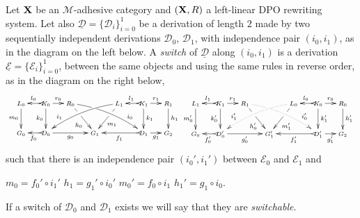 \documentclass[a4paper,UKenglish,cleveref,pdftex,thm-restate,numberwithinsect,anonymous]{lipics}
\def\R{\mathsf{R}}
\def\X{\textbf {\textup{X}}}
\def\G{\textbf {\textup{G}}}
\newcommand{\dder}[1]{\mathscr{#1}}
\newcommand{\der}[1]{\underline{\dder{#1}}}
\begin{document}
\begin{definition}[Switch]
  \label{def:switch}
  Let $\X$ be an $\mathcal{M}$-adhesive category 
  and $(\X, \R)$ a left-linear DPO rewriting system. 
  Let also
  $\der{D}=\{\dder{D}_i\}_{i=0}^1$ be a derivation of length $2$ made
  by two sequentially independent derivations $\dder{D}_0$,
  $\dder{D}_1$, with independence pair $(i_0, i_1)$, as in the diagram
  on the left below. A \emph{switch} of $\der{D}$ along $(i_0,i_1)$ is
  a derivation $\der{E}=\{\dder{E}_i\}_{i=0}^1$, between the same objects and using the same rules
  in reverse order, as in the diagram on the right below, 
  \[
    \def\objectstyle{\scriptstyle}\def\labelstyle{\scriptstyle}
    \xymatrix@C=1.1mm@R=8mm{
      {L_0} \ar[d]_{m_0}
      & & {K_0} \ar@{>->}[ll]_{l_0} \ar[rr]^{r_0} \ar[d]_{k_0}
      & & {R_0} \ar[drr]|(.35)\hole_(.6){h_0}  \ar@/^.22cm/[drrrrrr]|(.3)\hole^(.75){i_0}
      & & & & 
      {L_1}\ar[dll]|(.35)\hole^(.6){m_1} \ar@/_.22cm/_(.75){i_1}[dllllll]
      & & {K_1} \ar@{>->}[ll]_{l_1} \ar[rr]^{r_1} \ar[d]^{k_1}
      & & {R_1} \ar[d]^{h_1} \\
      {G_0}
      & & {D_0} \ar@{>->}[ll]^{f_0} \ar[rrrr]_{g_0}
      & & & & {G_1} & &
      & &  {D_1} \ar@{>->}[llll]^{f_1} \ar[rr]_{g_1}
      & & {G_2}
    }
    \xymatrix@C=1.1mm@R=8mm{
      {L_1} \ar[d]_{m_0'}
      & & {K_1} \ar@{>->}[ll]_{l_1} \ar[rr]^{r_1} \ar[d]_{k_0'}
      & & {R_1} \ar[drr]|(.35)\hole_(.6){h_0'}  \ar@/^.22cm/@{.>}^(.75){i_0'}|(.3)\hole[drrrrrr]
      & & & & 
      {L_0}\ar[dll]|(.35)\hole^(.6){m_1'} \ar@/_.22cm/@{.>}_(.75){i_1'}[dllllll] 
      & & {K_0} \ar@{>->}[ll]_{l_0} \ar[rr]^{r_0} \ar[d]^{k_1'}
      & & {R_0} \ar[d]^{h_1'} \\
      {G_0}
      & & {D_0'} \ar@{>->}[ll]^{f_0'} \ar[rrrr]_{g_0'}
      & & & & {G'_1} & &
      & &  {D_1'} \ar@{>->}[llll]^{f_1'} \ar[rr]_{g_1'}
      & & {G_2}  }
  \]
  such that there is an independence pair $(i_0', i_1')$ between
  $\dder{E}_0$ and $\dder{E}_1$ and 
  \begin{center}   
    $m_0=f_0' \circ i_1'$
    \qquad $h_1=g_1' \circ i_0'$
    \qquad $m_0'= f_0 \circ i_1$
    \qquad $h_1'= g_{1}\circ i_0$.
  \end{center}


  If a switch of $\dder{D}_0$ and $\dder{D}_1$ exists we will say that
  they are \emph{switchable}.



\end{definition}
\end{document}
